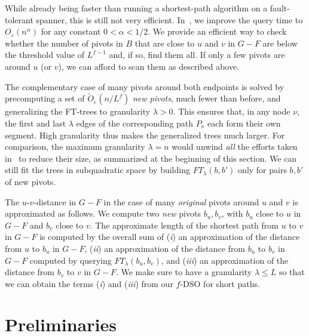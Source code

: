 \documentclass{article}\usepackage[a4paper,margin=20mm]{geometry}
\newcommand*{\Otilde}{\widetilde{O}}
\renewcommand{\le}{\leqslant}
\newcommand{\eps}{\varepsilon}
\begin{document}
While already being faster than running a shortest-path algorithm 
on a fault-tolerant spanner, this is still not very efficient.
In~, we improve the query time to 
$O_\eps(n^\alpha)$ 
for any constant $0 < \alpha < 1/2$.
We provide an efficient way to check whether the number of pivots in $B$
that are close to $u$ and $v$ in $G-F$ are below the threshold value of $L^{f-1}$
and, if so, find them all. 
If only a few pivots are around $u$ (or $v$),
we can afford to scan them as described above.

The complementary case of many pivots around both endpoints is solved by 
precomputing a set of $\Otilde_\eps(n/L^f)$ \emph{new pivots}, much fewer than before,
and generalizing the FT-trees to granularity $\lambda > 0$.
This ensures that, in any node $\nu$, the first and last $\lambda$ edges 
of the corresponding path $P_\nu$ each form their own segment.
High granularity thus makes the generalized trees much larger.
For comparison, the maximum granularity $\lambda = n$ would unwind \emph{all} the efforts
taken in~\cite{ChCoFiKa17} to reduce their size, as summarized at the beginning of this section.
We can still fit the trees in subquadratic space by building
$FT_\lambda(b,b')$ only for pairs $b,b'$ of new pivots.

The $u$-$v$-distance in $G-F$ in the case of many \emph{original} pivots around $u$ and $v$ is approximated as follows. We compute two \emph{new} pivots $b_u,b_v$,
with $b_u$ close to $u$ in $G-F$ and $b_v$ close to $v$.
The approximate length of the shortest path from $u$ to $v$ in $G-F$ is computed by the overall sum of (\textit{i}) an approximation of the distance from $u$ to $b_u$ in $G-F$, (\textit{ii}) an approximation of the distance from $b_u$ to $b_v$ in $G-F$ computed by querying $FT_\lambda(b_u,b_v)$, and (\textit{iii}) an approximation of the distance from $b_v$ to $v$ in $G-F$.
We make sure to have a granularity $\lambda \le L$ so that we can obtain the terms (\textit{i}) and (\textit{iii})
from our $f$-DSO for short paths.


\section{Preliminaries}
\label{sec:prelims}
\end{document}
